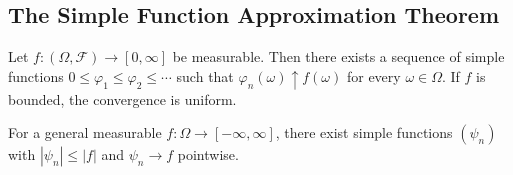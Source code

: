 \documentclass[11pt,a4paper]{article}
\begin{document}
\subsection{The Simple Function Approximation Theorem}
\label{subsec:approx_thm}

\begin{keyresult}[title={Simple Function Approximation}]
\begin{theorem}
\label{thm:approximation}
Let $f: (\Omega, \mathcal{F}) \to [0, \infty]$ be measurable. Then there
exists a sequence of simple functions
$0 \leq \varphi_1 \leq \varphi_2 \leq \cdots$ such that
$\varphi_n(\omega) \uparrow f(\omega)$ for every $\omega \in \Omega$.
If $f$ is bounded, the convergence is uniform.

For a general measurable $f: \Omega \to [-\infty, \infty]$, there exist
simple functions $(\psi_n)$ with $|\psi_n| \leq |f|$ and
$\psi_n \to f$ pointwise.
\end{theorem}
\end{keyresult}
\end{document}

